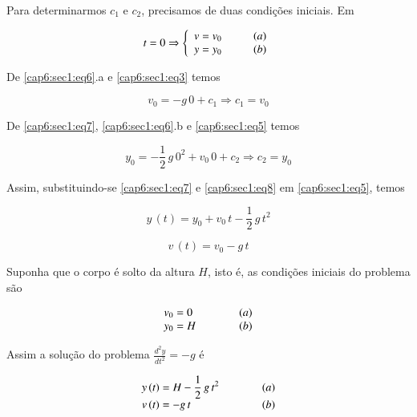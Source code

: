 Para determinarmos $ c_1 $ e $ c_2 $, precisamos de duas condições iniciais. Em

\begin{equation}
 \label{cap6:sec1:eq6}
 t = 0 \Rightarrow
 \left\{
 \begin{array}{l}
  v = v_0 \hspace*{1cm} (a)\\
  y = y_0 \hspace*{1cm} (b)
 \end{array}
 \right.
\end{equation}

De \ref{cap6:sec1:eq6}.a e \ref{cap6:sec1:eq3} temos

\begin{equation}
 \label{cap6:sec1:eq7}
 v_0 = -g \, 0 + c_1 \Rightarrow c_1 = v_0
\end{equation}

De \ref{cap6:sec1:eq7}, \ref{cap6:sec1:eq6}.b e \ref{cap6:sec1:eq5} temos

\begin{equation}
 \label{cap6:sec1:eq8}
 y_0 = -\frac{1}{2} \, g \, 0^2 + v_0 \, 0 + c_2 \Rightarrow c_2 = y_0
\end{equation}

Assim, substituindo-se \ref{cap6:sec1:eq7} e \ref{cap6:sec1:eq8} em \ref{cap6:sec1:eq5}, temos

\begin{equation}
 \label{cap6:sec1:eq9}
 y \, (t) = y_0 + v_0 \, t - \frac{1}{2} \, g \, t^2
\end{equation}

\begin{equation}
 \label{cap6:sec1:eq10}
 v \, (t) = v_0 - g \, t
\end{equation}

Suponha que o corpo é solto da altura $H$, isto é, as condições iniciais do problema são

\begin{equation}
 \label{cap6:sec1:eq11}
 \begin{array}{lr}
  v_0 = 0 & \hspace*{1cm} (a) \\
  y_0 = H & \hspace*{1cm} (b)
 \end{array}
\end{equation}

Assim a solução do problema $ \displaystyle \frac{d^2y}{dt^2} = -g $ é

\begin{equation}
\label{cap6:sec1:eq12}
 \begin{array}{lr}
  y \, (t) = H - \displaystyle \frac{1}{2} \, g \, t^2 & \hspace*{1cm} (a) \\
  v \, (t) = -g \, t & \hspace*{1cm} (b)
 \end{array}
\end{equation}


